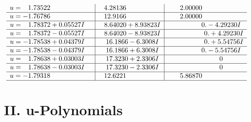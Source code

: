 \documentclass[1p]{elsarticle_modified}
\theoremstyle{definition}
\begin{document}
$$\begin{array}{c|c|c}
\begin{aligned}
u &= \phantom{-}1.73522\phantom{ +0.000000I}\end{aligned}
 & \phantom{-}4.28136\phantom{ +0.000000I} & \phantom{-}2.00000\phantom{ +0.000000I} \\ \hline\begin{aligned}
u &= -1.76786\phantom{ +0.000000I}\end{aligned}
 & \phantom{-}12.9166\phantom{ +0.000000I} & \phantom{-}2.00000\phantom{ +0.000000I} \\ \hline\begin{aligned}
u &= \phantom{-}1.78372 + 0.05527 I\end{aligned}
 & \phantom{-}8.64020 + 8.93823 I & \phantom{-0.000000 } 0. - 4.29230 I \\ \hline\begin{aligned}
u &= \phantom{-}1.78372 - 0.05527 I\end{aligned}
 & \phantom{-}8.64020 - 8.93823 I & \phantom{-0.000000 -}0. + 4.29230 I \\ \hline\begin{aligned}
u &= -1.78538 + 0.04379 I\end{aligned}
 & \phantom{-}16.1866 - 6.3008 I & \phantom{-0.000000 -}0. + 5.54756 I \\ \hline\begin{aligned}
u &= -1.78538 - 0.04379 I\end{aligned}
 & \phantom{-}16.1866 + 6.3008 I & \phantom{-0.000000 } 0. - 5.54756 I \\ \hline\begin{aligned}
u &= \phantom{-}1.78638 + 0.03003 I\end{aligned}
 & \phantom{-}17.3230 + 2.3306 I & \phantom{-0.000000 } 0 \\ \hline\begin{aligned}
u &= \phantom{-}1.78638 - 0.03003 I\end{aligned}
 & \phantom{-}17.3230 - 2.3306 I & \phantom{-0.000000 } 0 \\ \hline\begin{aligned}
u &= -1.79318\phantom{ +0.000000I}\end{aligned}
 & \phantom{-}12.6221\phantom{ +0.000000I} & \phantom{-}5.86870\phantom{ +0.000000I}\\
 \hline 
 \end{array}$$\newpage
\newpage\renewcommand{\arraystretch}{1}
\centering \section*{ II. u-Polynomials}
\end{document}
